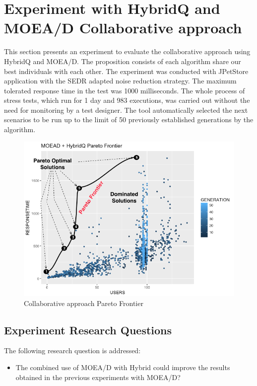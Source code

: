 \documentclass[espaco=umemeio,chapter=TITLE,twoside,openright]{abnt}
\begin{document}
\section{Experiment with HybridQ and MOEA/D Collaborative approach}

This section presents an experiment to evaluate the collaborative approach using HybridQ and MOEA/D. The proposition consists of each algorithm share our best individuals with each other. The experiment was conducted with JPetStore application with the SEDR adapted  noise reduction strategy. The maximum tolerated response time in the test was 1000 milliseconds.  The whole process of stress  tests, which run for 1 day and 983 executions, was carried out without the need for monitoring by a test designer. The tool automatically selected the next scenarios to be run up to the limit of 50 previously established  generations by the algorithm.

\begin{figure}[h]
\centering
\includegraphics[width=1\textwidth]{./images/moeadhybridq.png}
    \caption{Collaborative approach Pareto Frontier}
\label{fig:singlewithmulti}
\end{figure}

\subsection{Experiment Research Questions}

The following research question is addressed:
\begin{itemize}
\item The combined use of MOEA/D with Hybrid could improve the results obtained in the previous experiments with MOEA/D?
\end{itemize}
\end{document}
